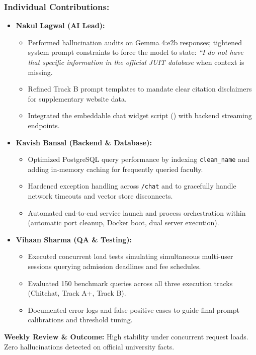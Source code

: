 \documentclass[11pt,a4paper]{article}
\begin{document}
\subsubsection*{Individual Contributions:}
\begin{itemize}
    \setlength{\itemsep}{1pt}
    \item \textbf{Nakul Lagwal (AI Lead):}
    \begin{itemize}
        \setlength{\itemsep}{0pt}
        \item Performed hallucination audits on Gemma 4:e2b responses; tightened system prompt constraints to force the model to state: \textit{``I do not have that specific information in the official JUIT database} when context is missing.
        \item Refined Track B prompt templates to mandate clear citation disclaimers for supplementary website data.
        \item Integrated the embeddable chat widget script () with backend streaming endpoints.
    \end{itemize}

    \item \textbf{Kavish Bansal (Backend \& Database):}
    \begin{itemize}
        \setlength{\itemsep}{0pt}
        \item Optimized PostgreSQL query performance by indexing \texttt{clean\_name} and adding in-memory caching for frequently queried faculty.
        \item Hardened exception handling across \texttt{/chat} and  to gracefully handle network timeouts and vector store disconnects.
        \item Automated end-to-end service launch and process orchestration within  (automatic port cleanup, Docker boot, dual server execution).
    \end{itemize}

    \item \textbf{Vihaan Sharma (QA \& Testing):}
    \begin{itemize}
        \setlength{\itemsep}{0pt}
        \item Executed concurrent load tests simulating simultaneous multi-user sessions querying admission deadlines and fee schedules.
        \item Evaluated 150 benchmark queries across all three execution tracks (Chitchat, Track A+, Track B).
        \item Documented error logs and false-positive cases to guide final prompt calibrations and threshold tuning.
    \end{itemize}
\end{itemize}
\noindent \textbf{Weekly Review \& Outcome:} High stability under concurrent request loads. Zero hallucinations detected on official university facts.
\end{document}
